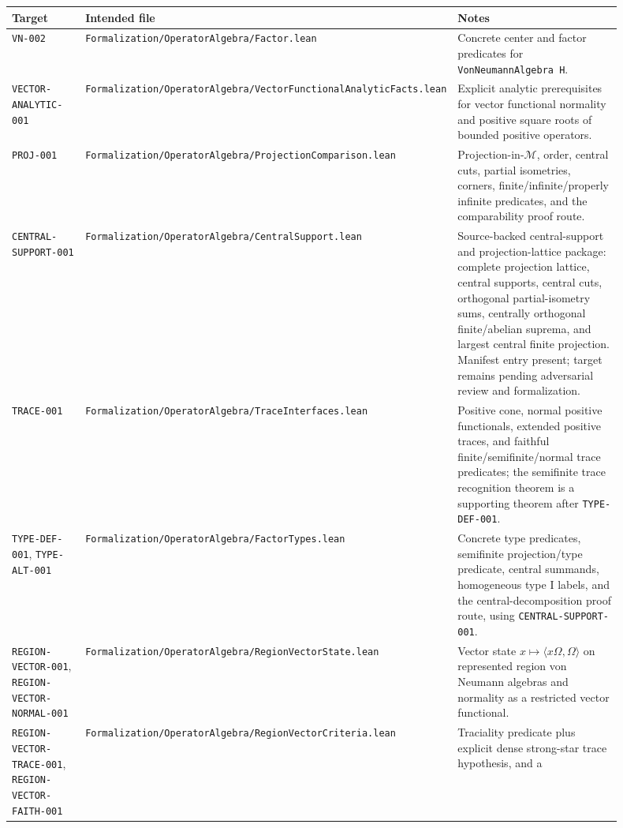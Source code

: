 \documentclass{article}
\newcommand{\cM}{\mathcal M}
\begin{document}
\begin{longtable}{@{}p{0.16\linewidth}p{0.34\linewidth}p{0.40\linewidth}@{}}
\toprule
Target & Intended file & Notes \\
\midrule
\endhead
\texttt{VN-002} &
\texttt{Formalization/OperatorAlgebra/Factor.lean} &
Concrete center and factor predicates for \texttt{VonNeumannAlgebra H}. \\
\texttt{VECTOR-ANALYTIC-001} &
\texttt{Formalization/OperatorAlgebra/VectorFunctionalAnalyticFacts.lean} &
Explicit analytic prerequisites for vector functional normality and positive
square roots of bounded positive operators. \\
\texttt{PROJ-001} &
\texttt{Formalization/OperatorAlgebra/ProjectionComparison.lean} &
Projection-in-\(\cM\), order, central cuts, partial isometries, corners,
finite/infinite/properly infinite predicates, and the comparability proof
route. \\
\texttt{CENTRAL-SUPPORT-001} &
\texttt{Formalization/OperatorAlgebra/CentralSupport.lean} &
Source-backed central-support and projection-lattice package: complete
projection lattice, central supports, central cuts, orthogonal partial-isometry
sums, centrally orthogonal finite/abelian suprema, and largest central finite
projection.  Manifest entry present; target remains pending adversarial review
and formalization. \\
\texttt{TRACE-001} &
\texttt{Formalization/OperatorAlgebra/TraceInterfaces.lean} &
Positive cone, normal positive functionals, extended positive traces, and
faithful finite/semifinite/normal trace predicates; the semifinite trace
recognition theorem is a supporting theorem after \texttt{TYPE-DEF-001}. \\
\texttt{TYPE-DEF-001}, \texttt{TYPE-ALT-001} &
\texttt{Formalization/OperatorAlgebra/FactorTypes.lean} &
Concrete type predicates, semifinite projection/type predicate, central
summands, homogeneous type I labels, and the central-decomposition proof route,
using \texttt{CENTRAL-SUPPORT-001}. \\
\texttt{REGION-VECTOR-001},
\texttt{REGION-VECTOR-NORMAL-001} &
\texttt{Formalization/OperatorAlgebra/RegionVectorState.lean} &
Vector state \(x\mapsto\langle x\Omega,\Omega\rangle\) on represented region
von Neumann algebras and normality as a restricted vector functional. \\
\texttt{REGION-VECTOR-TRACE-001},
\texttt{REGION-VECTOR-FAITH-001} &
\texttt{Formalization/OperatorAlgebra/RegionVectorCriteria.lean} &
Traciality predicate plus explicit dense strong-star trace hypothesis, and a

\end{longtable}
\end{document}
